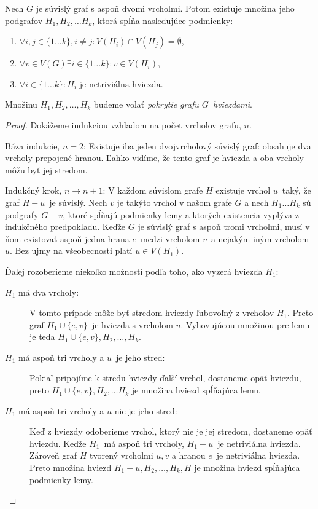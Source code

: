 \begin{lema}
    Nech $G$ je súvislý graf s aspoň dvomi vrcholmi. Potom existuje množina jeho podgrafov
    $H_1, H_2, \ldots H_k$, ktorá spĺňa nasledujúce podmienky:
    \begin{enumerate}
        \item $\forall i, j \in \{1 \ldots k\}, i \neq j: V(H_i) \cap V(H_j) = \emptyset$,
        \item $\forall v \in V(G) \exists i \in \{1 \ldots k\}: v \in V(H_i)$,
        \item $\forall i \in \{1 \ldots k\}: H_i \textrm{ je netriviálna hviezda}$.
    \end{enumerate}

    Množinu $H_1, H_2, \ldots, H_k$ budeme volať \emph{pokrytie grafu $G$ hviezdami}.
\end{lema}

\begin{proof}
    Dokážeme indukciou vzhľadom na počet vrcholov grafu, $n$.

    Báza indukcie, $n = 2$: Existuje iba jeden dvojvrcholový súvislý
    graf: obsahuje dva vrcholy prepojené hranou. Ľahko vidíme, že tento graf je hviezda a oba vrcholy
    môžu byť jej stredom.

    Indukčný krok, $n \to n+1$: V každom súvislom grafe $H$ existuje vrchol $u$ taký, že graf $H - u$ je súvislý.
    Nech $v$ je takýto vrchol v našom grafe $G$ a nech $H_1 \ldots H_k$ sú podgrafy $G-v$, ktoré spĺňajú
    podmienky lemy a ktorých existencia vyplýva z indukčného predpokladu. Keďže $G$ je súvislý graf s aspoň
    tromi vrcholmi, musí v ňom existovať aspoň jedna hrana $e$ medzi vrcholom $v$ a nejakým iným vrcholom $u$.
    Bez ujmy na všeobecnosti platí $u \in V(H_1)$.

    Ďalej rozoberieme niekoľko možností podľa toho, ako vyzerá hviezda $H_1$:

    \begin{description}
        \item[$H_1$ má dva vrcholy:] V tomto prípade môže byť stredom hviezdy ľubovoľný z vrcholov $H_1$.
        Preto graf $H_1 \cup \{e, v\}$ je hviezda s vrcholom $u$. Vyhovujúcou množinou pre lemu je teda
        $H_1 \cup \{e, v\}, H_2, \ldots, H_k$.
        \item[$H_1$ má aspoň tri vrcholy a $u$ je jeho stred:] Pokiaľ pripojíme k stredu hviezdy ďalší
        vrchol, dostaneme opäť hviezdu, preto $H_1 \cup \{e, v\}, H_2, \ldots H_k$ je množina hviezd
        spĺňajúca lemu.
        \item[$H_1$ má aspoň tri vrcholy a $u$ nie je jeho stred:] Keď z hviezdy odoberieme vrchol, ktorý
        nie je jej stredom, dostaneme opäť hviezdu. Keďže $H_1$ má aspoň tri vrcholy, $H_1 - u$ je netriviálna
        hviezda. Zároveň graf $H$ tvorený vrcholmi $u, v$ a hranou $e$ je netriviálna hviezda. Preto množina
        hviezd $H_1 - u, H_2, \ldots, H_k, H$ je množina hviezd spĺňajúca podmienky lemy.
    \end{description}
\end{proof}

